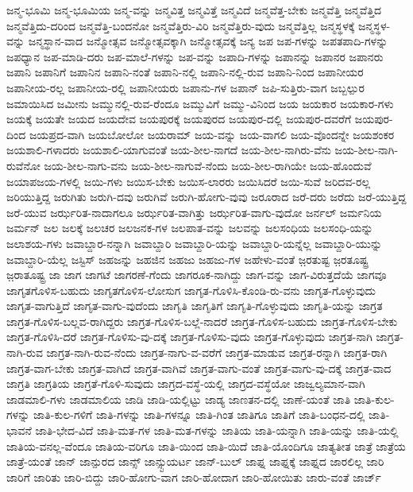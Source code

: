 {ಜನ್ಮ-ಭೂಮಿ
ಜನ್ಮ-ಭೂಮಿಯ
ಜನ್ಮ-ವನ್ನು
ಜನ್ಮವಿತ್ತ
ಜನ್ಮವಿತ್ತೆ
ಜನ್ಮವಿದೆ
ಜನ್ಮವೆತ್ತ-ಬೇಕು
ಜನ್ಮವೆತ್ತಿ
ಜನ್ಮವೆತ್ತಿದ
ಜನ್ಮವೆತ್ತಿದು-ದರಿಂದ
ಜನ್ಮವೆತ್ತಿ-ಬಂದನೋ
ಜನ್ಮವೆತ್ತಿರು-ವಿರಿ
ಜನ್ಮವೆತ್ತಿರು-ವುದು
ಜನ್ಮವೆತ್ತಿಲ್ಲ
ಜನ್ಮಸ್ಥಳಕ್ಕೆ
ಜನ್ಮಸ್ಥಳ-ವನ್ನು
ಜನ್ಮಸ್ಥಾನ-ವಾದ
ಜನ್ಮೋತ್ಸವ
ಜನ್ಮೋತ್ಸವಕ್ಕಾಗಿ
ಜನ್ಮೋತ್ಸವಕ್ಕೆ
ಜನ್ಯ
ಜಪ
ಜಪ-ಗಳನ್ನು
ಜಪತಪಾದಿ-ಗಳನ್ನು
ಜಪಧ್ಯಾನ
ಜಪ-ಮಾಡಿ-ದರು
ಜಪ-ಮಾಲೆ-ಗಳನ್ನು
ಜಪ-ವನ್ನು
ಜಪಾದಿ-ಗಳನ್ನು
ಜಪಾನನ್ನು
ಜಪಾನರ
ಜಪಾನರು
ಜಪಾನಿ
ಜಪಾನಿಗೆ
ಜಪಾನಿನ
ಜಪಾನಿ-ನಂತೆ
ಜಪಾನಿ-ನಲ್ಲಿ
ಜಪಾನಿ-ನಲ್ಲಿ-ರುವ
ಜಪಾನಿ-ನಿಂದ
ಜಪಾನೀಯರ
ಜಪಾನೀಯ-ರಲ್ಲ
ಜಪಾನೀಯ-ರಲ್ಲಿ
ಜಪಾನೀಯರು
ಜಪಾನು-ಗಳ
ಜಪಾನ್
ಜಪಿ-ಸುತ್ತಿರು-ವಾಗ
ಜಬ್ಬಲ್ಪುರ
ಜಮಾಯಿಸಿದ
ಜಮೀನು
ಜಮ್ಮುನಲ್ಲಿ-ರುವ-ರೆಂದೂ
ಜಮ್ಮುವಿಗೆ
ಜಮ್ಮು-ವಿನಿಂದ
ಜಯ
ಜಯಕಾರ
ಜಯಕಾರ-ಗಳು
ಜಯಕ್ಕೆ
ಜಯತೇ
ಜಯದ
ಜಯದೇವ
ಜಯಪುರಕ್ಕೆ
ಜಯಪುರದ
ಜಯಪುರ-ದಲ್ಲಿ
ಜಯಪುರ-ದವರೆಗೆ
ಜಯಪುರ-ದಿಂದ
ಜಯಪ್ರದ-ವಾಗಿ
ಜಯಬೋಲೋ
ಜಯರಾಮ್
ಜಯ-ವನ್ನು
ಜಯ-ವಾಗಲಿ
ಜಯ-ವೊಂದನ್ನೇ
ಜಯಶಂಕರ
ಜಯಶಾಲಿ-ಗಳಾದರು
ಜಯಶಾಲಿ-ಯಾಗುವಂತೆ
ಜಯ-ಶೀಲ-ನಾಗದೆ
ಜಯ-ಶೀಲ-ನಾಗಿರು-ವೆನು
ಜಯ-ಶೀಲ-ನಾಗಿ-ರುವೆನೋ
ಜಯ-ಶೀಲ-ನಾಗು-ವನು
ಜಯ-ಶೀಲ-ನಾಗುವೆ-ನೆಂದು
ಜಯ-ಶೀಲ-ರಾಗಿಯೇ
ಜಯ-ಹೊಂದುವೆ
ಜಯಾಪಜಯ-ಗಳಲ್ಲಿ
ಜಯಿ-ಗಳು
ಜಯಿಸ-ಬೇಕು
ಜಯಿಸ-ಲಾರರು
ಜಯಿಸಿದರೆ
ಜಯಿ-ಸುವೆ
ಜರಿದವ-ರಲ್ಲ
ಜರಿಯುತ್ತಿದ್ದ
ಜರುಗಿತು
ಜರುಗಿ-ದವು
ಜರುಗಿವೆ
ಜರುಗಿ-ಹೋಗು-ವುವು
ಜರೂರಾದ
ಜರೆ-ದರು
ಜರೆದು
ಜರೆ-ಯುತ್ತಿದ್ದ
ಜರೆ-ಯುವ
ಜರ್ಝರಿತ-ನಾದಾಗಲೂ
ಜರ್ಝರಿತ-ವಾಗಿತ್ತು
ಜರ್ಝರಿತ-ವಾಗು-ವುದೋ
ಜರ್ನಲ್
ಜರ್ಮನಿಯ
ಜರ್ಮನ್
ಜಲ
ಜಲಕ್ಕೆ
ಜಲಚರ
ಜಲಜನಕ-ಗಳ
ಜಲಪಾತ-ವನ್ನು
ಜಲವನ್ನು
ಜಲಸಂಧಿಯ
ಜಲಸಂಧಿ-ಯನ್ನು
ಜಲಾಶಯ-ಗಳು
ಜವಾಬ್ದಾರ-ನನ್ನಾಗಿ
ಜವಾಬ್ದಾರಿ
ಜವಾಬ್ದಾರಿ-ಯನ್ನು
ಜವಾಬ್ದಾರಿ-ಯನ್ನೆಲ್ಲ
ಜವಾಬ್ದಾರಿ-ಯುನ್ನು
ಜವಾಬ್ದಾರಿ-ಯೆಲ್ಲ
ಜಸ್ಟಿಸ್
ಜಹಜನ್ನು
ಜಹಜಿನ
ಜಹಜು
ಜಹಜು-ಗಳ
ಜಹೇಳು-ವಂತೆ
ಜ಼ರತುಷ್ಟ
ಜ಼ರತೂಷ್ಟ್ರ
ಜ಼ರಾತೂಷ್ಟ್ರ
ಜಾ
ಜಾಗ
ಜಾಗಟೆ
ಜಾಗರಣೆ-ಗೆಂದು
ಜಾಗರೂಕ-ನಾಗಿದ್ದು
ಜಾಗ-ವನ್ನು
ಜಾಗ-ವಿರುತ್ತದೆಯೆ
ಜಾಗವೂ
ಜಾಗೃತಗೊಳಿಸ-ಬಹುದು
ಜಾಗೃತಗೊಳಿಸ-ಲೋಸುಗ
ಜಾಗೃತ-ಗೊಳಿಸಿ-ಕೊಂಡಿ-ರು-ವನು
ಜಾಗೃತ-ಗೊಳ್ಳುವುದು
ಜಾಗೃತ-ವಾಗುತ್ತಿದೆ
ಜಾಗೃತ-ವಾಗು-ವುದೆಂದು
ಜಾಗೃತಿ
ಜಾಗೃತಿಗೆ
ಜಾಗೃತಿ-ಗೊಳ್ಳುವುದು
ಜಾಗೃತಿ-ಯನ್ನು
ಜಾಗ್ರತ
ಜಾಗ್ರತ-ಗೊಳಿಸ-ಬಲ್ಲವ-ರಾಗಿದ್ದರು
ಜಾಗ್ರತ-ಗೊಳಿಸ-ಬಲ್ಲೆ-ನಾದರೆ
ಜಾಗ್ರತ-ಗೊಳಿಸ-ಬಹುದು
ಜಾಗ್ರತ-ಗೊಳಿಸ-ಬೇಕು
ಜಾಗ್ರತ-ಗೊಳಿಸಿ-ದರೆ
ಜಾಗ್ರತ-ಗೊಳಿಸು-ವು-ದಕ್ಕೆ
ಜಾಗ್ರತ-ಗೊಳಿಸು-ವುದು
ಜಾಗ್ರತ-ಗೊಳ್ಳುವುದು
ಜಾಗ್ರತ-ನಾಗಿ
ಜಾಗ್ರತ-ನಾಗಿ-ರುವ
ಜಾಗ್ರತ-ನಾಗಿ-ರುವ-ನೆಂದು
ಜಾಗ್ರತ-ನಾಗು-ವ-ವರೆಗೆ
ಜಾಗ್ರತ-ಮಾಡುವ
ಜಾಗ್ರತ-ರನ್ನಾಗಿ
ಜಾಗ್ರತ-ರಾಗಿ
ಜಾಗ್ರತ-ವಾಗ-ಬೇಕು
ಜಾಗ್ರತ-ವಾಗಿದೆ
ಜಾಗ್ರತ-ವಾಗಿವೆ
ಜಾಗ್ರತ-ವಾಗು-ವಂತೆ
ಜಾಗ್ರತ-ವಾಗು-ವು-ದಕ್ಕೆ
ಜಾಗ್ರತ-ವಾದ
ಜಾಗ್ರತಿ
ಜಾಗ್ರತಿಯ
ಜಾಗ್ರತೆ-ಗೊಳಿ-ಸುವುದು
ಜಾಗ್ರದ-ವಸ್ಥೆ-ಯಲ್ಲಿ
ಜಾಗ್ರದ-ವಸ್ಥೆಯೋ
ಜಾಜ್ವಲ್ಯಮಾನ-ವಾಗಿ
ಜಾಡಮಾಲಿ-ಗಳು
ಜಾಡಮಾಲಿಯ
ಜಾಡಿ
ಜಾಡಿ-ಯಲ್ಲಿಟ್ಟು
ಜಾಡ್ಯ
ಜಾಣತನ-ದಲ್ಲಿ
ಜಾಣೆ-ಯಂತೆ
ಜಾತಿ
ಜಾತಿ-ಕುಲ-ಗಳನ್ನು
ಜಾತಿ-ಕುಲ-ಗಳಿಗೆ
ಜಾತಿ-ಗಳನ್ನು
ಜಾತಿ-ಗಳನ್ನೂ
ಜಾತಿ-ಗಿಂತ
ಜಾತಿಗೂ
ಜಾತಿಗೆ
ಜಾತಿ-ಬಂಧನ-ದಲ್ಲಿ
ಜಾತಿ-ಭಾವನೆ
ಜಾತಿ-ಭೇದ-ವಿದೆ
ಜಾತಿ-ಮತ-ಗಳ
ಜಾತಿ-ಮತ-ಗಳನ್ನು
ಜಾತಿಯ
ಜಾತಿ-ಯನ್ನಾಗಿ
ಜಾತಿ-ಯನ್ನು
ಜಾತಿ-ಯಲ್ಲಿ
ಜಾತಿಯ-ವನಲ್ಲ-ವೆಂದೂ
ಜಾತಿಯ-ವರಿಗೂ
ಜಾತಿ-ಯಿಂದ
ಜಾತಿ-ಯಿದೆ
ಜಾತಿ-ಯೊಂದಿಗೂ
ಜಾತ್ಯತೀತ
ಜಾತ್ರೆ
ಜಾತ್ರೆಯ
ಜಾತ್ರೆ-ಯಂತೆ
ಜಾನ್
ಜಾನ್ಪುರದ
ಜಾನ್ಸ್
ಜಾನ್ಸ್ಟುಯರ್ಟ
ಜಾನ್-ಬುಲ್
ಜಾಫ್ನ
ಜಾಫ್ನಕ್ಕೆ
ಜಾಫ್ನದ
ಜಾರಲಿಲ್ಲ
ಜಾರಿ
ಜಾರಿಗೆ
ಜಾರಿತು
ಜಾರಿ-ಬಿದ್ದು
ಜಾರಿ-ಹೋಗು-ವಾಗ
ಜಾರಿ-ಹೋದಾಗ
ಜಾರಿ-ಹೋಯಿತು
ಜಾರು-ವಂತೆ
ಜಾರ್ಜ್
}
